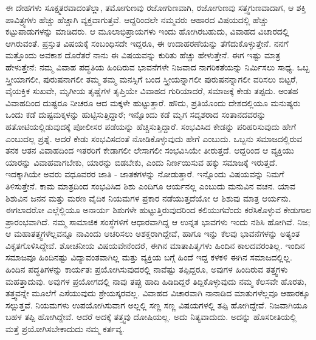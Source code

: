 ಈ ದೇಹಗಳು ಸೂಕ್ಷ್ಮತರವಾದಂತೆಲ್ಲಾ, ತಮೋಗುಣವು ರಜೋಗುಣವಾಗಿ, ರಜೋಗುಣವು ಸತ್ತ್ವಗುಣವಾದಾಗ, ಆ ಶಕ್ತಿ ಪಾವಿತ್ರ್ಯಗಳು ಹೆಚ್ಚು ಹೆಚ್ಚಾಗಿ ವ್ಯಕ್ತವಾಗುತ್ತವೆ. ಆದ್ದರಿಂದಲೇ ನಮ್ಮವರು ಆಹಾರದ ವಿಷಯದಲ್ಲಿ ಹೆಚ್ಚು ಕಟ್ಟುಪಾಡುಗಳನ್ನು ಮಾಡಿದರು. ಆ ಮೂಲಾಭಿಪ್ರಾಯಗಳು ಇಂದು ಹೋಗಿರಬಹುದು, ವಿವಾಹದ ವಿಚಾರದಲ್ಲಿ ಆಗಿರುವಂತೆ. ಪ್ರಸ್ತುತ ವಿಷಯಕ್ಕೆ ಸಂಬಂಧಿಸದೇ ಇದ್ದರೂ, ಈ ಉದಾಹರಣೆಯನ್ನು ತೆಗೆದುಕೊಳ್ಳುತ್ತೇನೆ. ನನಗೆ ಮತ್ತೊಂದು ಅವಕಾಶ ದೊರೆತರೆ ನಾನು ಈ ವಿಷಯವನ್ನು ಕುರಿತು ಹೆಚ್ಚು ಹೇಳುತ್ತೇನೆ. ಈಗ ಇಷ್ಟು ಮಾತ್ರ ಹೇಳುತ್ತೇನೆ: ನಮ್ಮ ವಿವಾಹ ಪದ್ಧತಿಯ ಹಿಂದಿರುವ ಭಾವನೆಗಳೇ ನಿಜವಾದ ನಾಗರಿಕತೆಯನ್ನು ನಿರ್ಮಿಸಲು ಸಾಧ್ಯ. ಒಬ್ಬ ಸ್ತ್ರೀಯಾಗಲೀ, ಪುರುಷನಾಗಲೀ ತಮ್ಮ ತಮ್ಮ ಮನಸ್ಸಿಗೆ ಬಂದ ಸ್ತ್ರೀಯನ್ನಾಗಲೀ ಪುರುಷನನ್ನಾಗಲೀ ವರಿಸಲು ಬಿಟ್ಟರೆ, ವೈಯಕ್ತಿಕ ಸುಖವೇ, ಮೃಗೀಯ ತೃಷ್ಣೆಗಳ ತೃಪ್ತಿಯೇ ವಿವಾಹದ ಗುರಿಯಾದರೆ, ಸಮಾಜಕ್ಕೆ ಕೇಡು ತಪ್ಪದು. ಅಂತಹ ವಿವಾಹದಿಂದ ದುಷ್ಟರೂ ನೀಚರೂ ಆದ ಮಕ್ಕಳೇ ಹುಟ್ಟುತ್ತಾರೆ. ಹೌದು, ಪ್ರತಿಯೊಂದು ದೇಶದಲ್ಲಿಯೂ ಮನುಷ್ಯರು ಒಂದು ಕಡೆ ದುಷ್ಟಮಕ್ಕಳನ್ನು ಹುಟ್ಟಿಸುತ್ತಿದ್ದಾರೆ; ಇನ್ನೊಂದು ಕಡೆ ಮೃಗ ಸದೃಶರಾದ ಸಂತಾನದವರನ್ನು ಹತೋಟಿಯಲ್ಲಿಡುವುದಕ್ಕೆ ಪೋಲೀಸರ ಪಡೆಯನ್ನು ಹೆಚ್ಚಿಸುತ್ತಿದ್ದಾರೆ. ಸಂಭವಿಸಿದ ಕೇಡನ್ನು ಪರಿಹರಿಸುವುದು ಹೇಗೆ ಎಂಬುದಲ್ಲ ಪ್ರಶ್ನೆ. ಆದರೆ ಕೇಡು ಸಂಭವಿಸದಂತೆ ನೋಡಿಕೊಳ್ಳುವುದು ಹೇಗೆ ಎಂಬುದು. ಒಬ್ಬನು ಸಮಾಜದಲ್ಲಿರುವ ತನಕ ಆತನ ವಿವಾಹದಿಂದ ಇತರರಿಗೆ ಕೇಡಾಗಲೀ ಲೇಸಾಗಲೀ ಸಂಭವಿಸಿಯೇ ತೀರುತ್ತದೆ. ಆದ್ದರಿಂದ ಆ ವ್ಯಕ್ತಿಯು ಯಾರನ್ನು ವಿವಾಹವಾಗಬೇಕು, ಯಾರನ್ನು ಬಿಡಬೇಕು, ಎಂದು ನಿರ್ಣಯಿಸುವ ಹಕ್ಕು ಸಮಾಜಕ್ಕೆ ಇರುತ್ತದೆ. ಇದಕ್ಕಾಗಿಯೇ ಅವರು ವಧೂವರರ ಜಾತಿ - ಜಾತಕಗಳನ್ನು ನೋಡುತ್ತಾರೆ. ಇನ್ನೊಂದು ವಿಷಯವನ್ನು ನಿಮಗೆ ತಿಳಿಸುತ್ತೇನೆ. ಕಾಮ ಮಾತ್ರದಿಂದ ಸಂಭವಿಸಿದ ಶಿಶು ಎಂದಿಗೂ ಆರ್ಯನಲ್ಲ ಎಂಬುದು ಮನುವಿನ ವಚನ. ಯಾವ ಶಿಶುವಿನ ಜನನ ಮತ್ತು ಮರಣ ವೈದಿಕ ನಿಯಮಗಳ ಪ್ರಕಾರ ನಡೆಯುತ್ತದೆಯೋ ಆ ಶಿಶುವು ಮಾತ್ರ ಆರ್ಯನು. ಈಗಲಾದರೋ ಎಲ್ಲೆಲ್ಲಿಯೂ ಅನಾರ್ಯ ಶಿಶುಗಳೇ ಹುಟ್ಟುತ್ತಿರುವುದರಿಂದ ಕಲಿಯುಗವೆಂದು ಕರೆಸಿಕೊಳ್ಳುವ ಕೇಡುಗಾಲ ಪ್ರಾರಂಭವಾಗಿದೆ. ನಮ್ಮ ಸಾಮಾಜಿಕ ಸಂಸ್ಥೆಗಳಿಗೆ ಆಧಾರವಾಗಿದ್ದ ಆ ಉನ್ನತ ಭಾವಗಳು ಇಂದು ನಶಿಸಿ ಹೋಗಿವೆ. ನಿಜ; ಆ ಮಹಾತತ್ತ್ವಗಳೆಲ್ಲವನ್ನೂ ನಾವಿಂದು ಆಚರಿಸಲು ಅಶಕ್ತರಾಗಿದ್ದೇವೆ, ಹಾಗೂ ಇನ್ನು ಕೆಲವು ಭಾವನೆಗಳನ್ನು ಅತ್ಯಂತ ವಿಕೃತಗೊಳಿಸಿದ್ದೇವೆ. ಶೋಚನೀಯ ವಿಷಯವೇನೆಂದರೆ, ಈಗಿನ ಮಾತಾಪಿತೃಗಳು ಹಿಂದಿನ ಕಾಲದವರಂತಿಲ್ಲ. ಇಂದಿನ ಸಮಾಜವೂ ಹಿಂದಿನಷ್ಟು ವಿದ್ಯಾವಂತವಾಗಿಲ್ಲ ಮತ್ತು ವ್ಯಕ್ತಿಯ ಬಗ್ಗೆ ಹಿಂದೆ ಇದ್ದ ಕಳಕಳಿ ಈಗಿನ ಸಮಾಜದಲ್ಲಿಲ್ಲ. ಹಿಂದಿನ ಪದ್ಧತಿಗಳನ್ನು ಕಾರ್ಯತಃ ಪ್ರಯೋಗಿಸುವುದರಲ್ಲಿ ನಾವೆಷ್ಟು ತಪ್ಪಿದ್ದರೂ, ಅವುಗಳ ಹಿಂದಿರುವ ತತ್ತ್ವಗಳು ಮಹತ್ತಾದುವು. ಅವುಗಳ ಪ್ರಯೋಗದಲ್ಲಿ ನಾವು ತಪ್ಪು ಹಾದಿ ಹಿಡಿದಿದ್ದರೆ ತಿದ್ದಿಕೊಳ್ಳುವುದು ನಮ್ಮ ಕೆಲಸವೇ ಹೊರತು, ತತ್ತ್ವವನ್ನೇ ಮೂಲೆಗೆ ಎಸೆಯುವುದು ಶ್ರೇಯಸ್ಕರವಲ್ಲ. ವಿವಾಹದ ವಿಚಾರವಾಗಿ ನಾನಾಡಿದ ಮಾತುಗಳೆಲ್ಲವೂ ಆಹಾರಕ್ಕೂ ಸಲ್ಲುತ್ತವೆ. ನಿಯಮಗಳು ಉಪಯೋಗಿಸುವಾಗ ಅಲ್ಲಲ್ಲಿ ಸಣ್ಣ ಸಣ್ಣ ವಿಷಯಗಳಲ್ಲಿ ತಪ್ಪಿ ಹೋಗಿದ್ದೇವೆ. ನಿಜವಾಗಿಯೂ ಬಹಳ ತಪ್ಪಿ ಹೋಗಿದ್ದೇವೆ. ಆದರೆ ಅದಕ್ಕೆ ತತ್ತ್ವವು ದೋಷಿಯಲ್ಲ. ಅದು ನಿತ್ಯವಾದುದು. ಅದನ್ನು ಹೊಸರೀತಿಯಲ್ಲಿ ಮತ್ತೆ ಪ್ರಯೋಗಿಸಬೇಕಾದುದು ನಮ್ಮ ಕರ್ತವ್ಯ.

